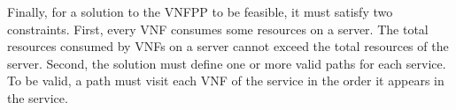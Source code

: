 Finally, for a solution to the VNFPP to be feasible, it must satisfy two constraints. First, every VNF consumes some resources on a server. The total resources consumed by VNFs on a server cannot exceed the total resources of the server. Second, the solution must define one or more valid paths for each service. To be valid, a path must visit each VNF of the service in the order it appears in the service.
